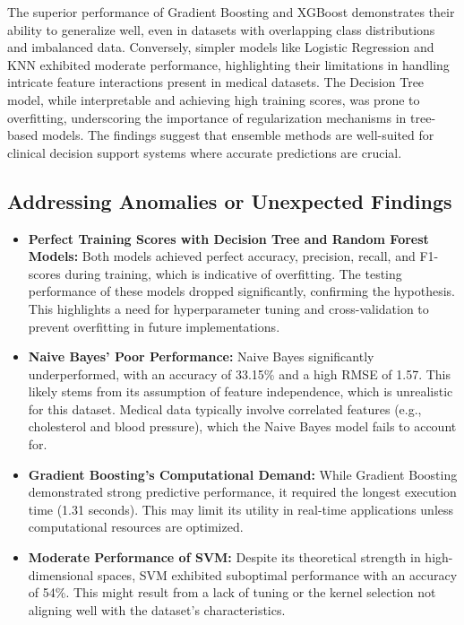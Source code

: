 \documentclass[pdflatex,sn-nature,Numbered]{sn-jnl}%
\theoremstyle{thmstyleone}%
\theoremstyle{thmstyletwo}%
\theoremstyle{thmstylethree}%
\begin{document}
The superior performance of Gradient Boosting and XGBoost demonstrates their ability to generalize well, even in datasets with overlapping class distributions and imbalanced data. Conversely, simpler models like Logistic Regression and KNN exhibited moderate performance, highlighting their limitations in handling intricate feature interactions present in medical datasets. The Decision Tree model, while interpretable and achieving high training scores, was prone to overfitting, underscoring the importance of regularization mechanisms in tree-based models. The findings suggest that ensemble methods are well-suited for clinical decision support systems where accurate predictions are crucial.

\subsection{Addressing Anomalies or Unexpected Findings}
\begin{itemize}
    \item \textbf{Perfect Training Scores with Decision Tree and Random Forest Models:} Both models achieved perfect accuracy, precision, recall, and F1-scores during training, which is indicative of overfitting. The testing performance of these models dropped significantly, confirming the hypothesis. This highlights a need for hyperparameter tuning and cross-validation to prevent overfitting in future implementations.
    \item \textbf{Naive Bayes' Poor Performance:} Naive Bayes significantly underperformed, with an accuracy of 33.15\% and a high RMSE of 1.57. This likely stems from its assumption of feature independence, which is unrealistic for this dataset. Medical data typically involve correlated features (e.g., cholesterol and blood pressure), which the Naive Bayes model fails to account for.
    \item \textbf{Gradient Boosting's Computational Demand:} While Gradient Boosting demonstrated strong predictive performance, it required the longest execution time (1.31 seconds). This may limit its utility in real-time applications unless computational resources are optimized.
    \item \textbf{Moderate Performance of SVM:} Despite its theoretical strength in high-dimensional spaces, SVM exhibited suboptimal performance with an accuracy of 54\%. This might result from a lack of tuning or the kernel selection not aligning well with the dataset's characteristics.
\end{itemize}
\end{document}
